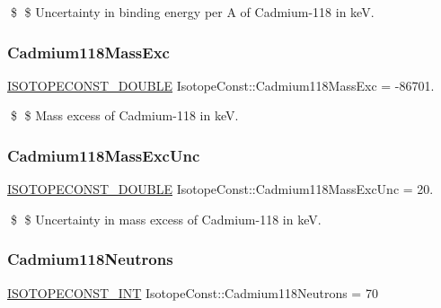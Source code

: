 \$ \$ Uncertainty in binding energy per A of Cadmium-\/118 in keV. \mbox{\label{group___isotope_const-_cadmium-_cd118_ga7347fa29c9cb67124bc735efab895403}} 
\subsubsection{\texorpdfstring{Cadmium118\+Mass\+Exc}{Cadmium118MassExc}}
{\footnotesize\ttfamily \mbox{\hyperlink{group___isotope_const-_macros_ga8f45a7272ce02c0b4c65c44636ed719a}{I\+S\+O\+T\+O\+P\+E\+C\+O\+N\+S\+T\+\_\+\+D\+O\+U\+B\+LE}} Isotope\+Const\+::\+Cadmium118\+Mass\+Exc = -\/86701.}

\$ \$ Mass excess of Cadmium-\/118 in keV. \mbox{\label{group___isotope_const-_cadmium-_cd118_ga8d18d73063983b80d1a0fcf1213bad87}} 
\subsubsection{\texorpdfstring{Cadmium118\+Mass\+Exc\+Unc}{Cadmium118MassExcUnc}}
{\footnotesize\ttfamily \mbox{\hyperlink{group___isotope_const-_macros_ga8f45a7272ce02c0b4c65c44636ed719a}{I\+S\+O\+T\+O\+P\+E\+C\+O\+N\+S\+T\+\_\+\+D\+O\+U\+B\+LE}} Isotope\+Const\+::\+Cadmium118\+Mass\+Exc\+Unc = 20.}

\$ \$ Uncertainty in mass excess of Cadmium-\/118 in keV. \mbox{\label{group___isotope_const-_cadmium-_cd118_gacbf6d269852ccb3c37b4e5331d81ea37}} 
\subsubsection{\texorpdfstring{Cadmium118\+Neutrons}{Cadmium118Neutrons}}
{\footnotesize\ttfamily \mbox{\hyperlink{group___isotope_const-_macros_ga5f18360b3e99483a35c32d789e62621c}{I\+S\+O\+T\+O\+P\+E\+C\+O\+N\+S\+T\+\_\+\+I\+NT}} Isotope\+Const\+::\+Cadmium118\+Neutrons = 70}

